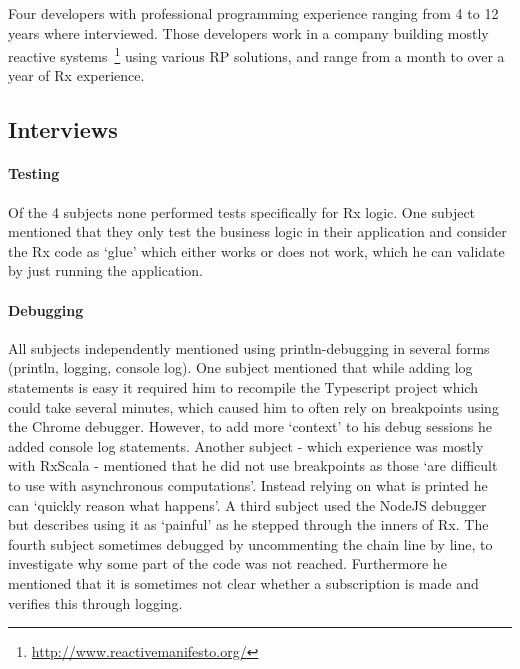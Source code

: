 Four developers with professional programming experience ranging from 4 to 12 years where interviewed.
Those developers work in a company building mostly reactive systems~\footnote{\url{http://www.reactivemanifesto.org/}} using various RP solutions,
and range from a month to over a year of Rx experience.

\subsection{Interviews}

\paragraph{Testing}
Of the 4 subjects none performed tests specifically for Rx logic. One subject mentioned that they only test the business logic in their application and consider the Rx code as `glue' which either works or does not work, which he can validate by just running the application.

\paragraph{Debugging}
All subjects independently mentioned using println-debugging in several forms (println, logging, console log).
One subject mentioned that while adding log statements is easy it required him to recompile the Typescript project which could take several minutes, 
which caused him to often rely on breakpoints using the Chrome debugger. However, to add more `context' to his debug sessions he added console log statements.
Another subject - which experience was mostly with RxScala - mentioned that he did not use breakpoints as those `are difficult to use with asynchronous computations'. Instead relying on what is printed he can `quickly reason what happens'.
A third subject used the NodeJS debugger but describes using it as `painful' as he stepped through the inners of Rx.
The fourth subject sometimes debugged by uncommenting the chain line by line, to investigate why some part of the code was not reached. Furthermore he mentioned that it is sometimes not clear whether a subscription is made and verifies this through logging.


